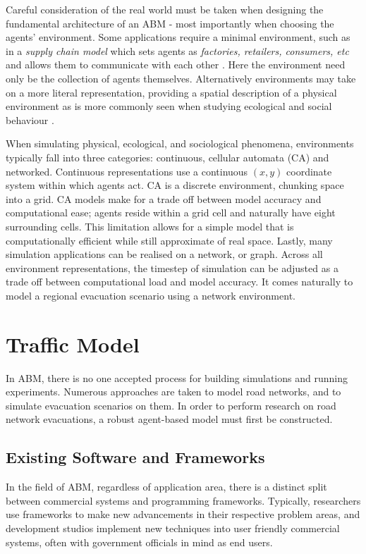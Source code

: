 Careful consideration of the real world must be taken when designing the fundamental architecture of an ABM - most importantly when choosing the agents' environment. Some applications require a minimal environment, such as in a \textit{supply chain model} which sets agents as \textit{factories, retailers, consumers, etc} and allows them to communicate with each other \cite{Macal2006TutorialAgents}. Here the environment need only be the collection of agents themselves. Alternatively environments may take on a more literal representation, providing a spatial description of a physical environment as is more commonly seen when studying ecological and social behaviour \cite{Macal2005TutorialSimulation}.

When simulating physical, ecological, and sociological phenomena, environments typically fall into three categories: continuous, cellular automata (CA) and networked. Continuous representations use a continuous $(x,y)$ coordinate system within which agents act. CA is a discrete environment, chunking space into a grid. CA models make for a trade off between model accuracy and computational ease; agents reside within a grid cell and naturally have eight surrounding cells. This limitation allows for a simple model that is computationally efficient while still approximate of real space. Lastly, many simulation applications can be realised on a network, or graph. Across all environment representations, the timestep of simulation can be adjusted as a trade off between computational load and model accuracy. It comes naturally to model a regional evacuation scenario using a network environment.


\section{Traffic Model}

In ABM, there is no one accepted process for building simulations and running experiments. Numerous approaches are taken to model road networks, and to simulate evacuation scenarios on them. In order to perform research on road network evacuations, a robust agent-based model must first be constructed.

\subsection{Existing Software and Frameworks}

In the field of ABM, regardless of application area, there is a distinct split between commercial systems and programming frameworks. Typically, researchers use frameworks to make new advancements in their respective problem areas, and development studios implement new techniques into user friendly commercial systems, often with government officials in mind as end users.

